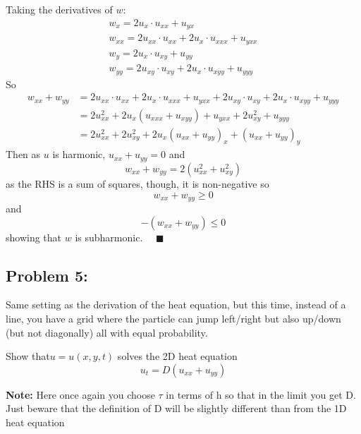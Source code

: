 \documentclass[12pt]{article}
\newcommand{\qed}{\quad \blacksquare}
\begin{document}
\begin{enumerate}
    \color{blue}
    Taking the derivatives of $w$:
    \begin{gather*}
        w_x = 2u_x \cdot u_{xx} + u_{yx}\\ 
        w_{xx} = 2u_{xx} \cdot u_{xx}  + 2u_x \cdot u_{xxx} + u_{yxx}\\
        w_y = 2u_x \cdot u_{xy} + u_{yy}\\
        w_{yy} = 2u_{xy} \cdot u_{xy} + 2u_x \cdot u_{xyy} + u_{yyy}
    \end{gather*}
    So 
    \begin{align*}
        w_{xx} + w_{yy} &= 2u_{xx} \cdot u_{xx}  + 2u_x \cdot u_{xxx} + u_{yxx} +  2u_{xy} \cdot u_{xy} + 2u_x \cdot u_{xyy} + u_{yyy}\\
        &= 2u_{xx}^2 + 2u_x(u_{xxx} + u_{xyy}) + u_{yxx} + 2u_{xy}^2 + u_{yyy}\\
        &= 2u_{xx}^2 + 2u_{xy}^2 + 2u_x(u_{xx} + u_{yy})_x + (u_{xx} + u_{yy})_y
    \end{align*}
    Then as $u$ is harmonic, $u_{xx} + u_{yy} = 0$ and 
    \[w_{xx} + w_{yy} = 2(u_{xx}^2 + u_{xy}^2)\]
    as the RHS is a sum of squares, though, it is non-negative so 
    \[w_{xx} + w_{yy} \geq 0\]
    and 
    \[-(w_{xx} + w_{yy}) \leq 0\]
    showing that $w$ is subharmonic. $\qed$ 
\end{enumerate}

\pagebreak
\subsection*{Problem 5:}
Same setting as the derivation of the heat equation, but this time, instead of a line, you have a grid where the particle can jump left/right but also up/down (but not diagonally) all with equal probability.

Show that$ u = u(x, y, t)$ solves the 2D heat equation
\[u_t = D (u_{xx }+ u_{yy})\]

\textbf{Note:} Here once again you choose $\tau$ in terms of h so that in the limit you get D. Just beware that the definition of D will be slightly different than from the 1D heat equation
\end{document}
